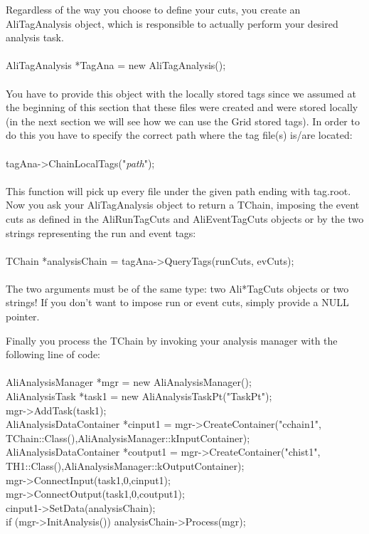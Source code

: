 \vspace{0.6cm}
Regardless of the way you choose to define your cuts, you create an {\ttfamily AliTagAnalysis} object, which is responsible to actually perform your desired analysis task.\\
\\
{\ttfamily AliTagAnalysis *TagAna = new AliTagAnalysis();}\\
\\
You have to provide this object with the locally stored tags since we assumed at the beginning of this section that these files were created and were stored locally (in the next section we will see how we can use the Grid stored tags). In order to do this you have to specify the correct path where the tag file(s) is/are located:\\ 
\\
{\ttfamily tagAna->ChainLocalTags("\emph{path}");}\\
\\
This function will pick up every file under the given path ending with {\ttfamily tag.root}. Now you ask your {\ttfamily AliTagAnalysis} object to return a {\ttfamily TChain}, imposing the event cuts as defined in the {\ttfamily AliRunTagCuts} and {\ttfamily AliEventTagCuts} objects or by the two strings representing the run and event tags:\\
\\
{\ttfamily TChain *analysisChain = tagAna->QueryTags(runCuts, evCuts);}\\
\\
The two arguments must be of the same type: two Ali*TagCuts objects or two strings! If you don't want to impose run or event cuts, simply provide a NULL pointer.

Finally you process the {\ttfamily TChain} by invoking your analysis manager with the following line of code:\\
\\
{\ttfamily  AliAnalysisManager *mgr = new AliAnalysisManager();}\\
{\ttfamily  AliAnalysisTask *task1 = new AliAnalysisTaskPt("TaskPt");}\\
{\ttfamily  mgr->AddTask(task1);}\\
{\ttfamily  AliAnalysisDataContainer *cinput1 = mgr->CreateContainer("cchain1", TChain::Class(),AliAnalysisManager::kInputContainer);}\\
{\ttfamily  AliAnalysisDataContainer *coutput1 = mgr->CreateContainer("chist1", TH1::Class(),AliAnalysisManager::kOutputContainer);}\\
{\ttfamily  mgr->ConnectInput(task1,0,cinput1);}\\
{\ttfamily  mgr->ConnectOutput(task1,0,coutput1);}\\
{\ttfamily  cinput1->SetData(analysisChain);}\\  
{\ttfamily  if (mgr->InitAnalysis()) analysisChain->Process(mgr);}\\

